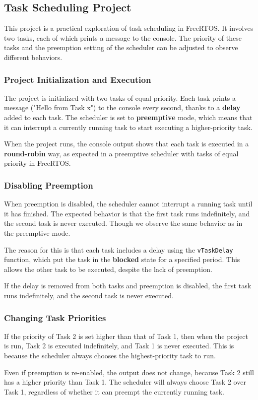 \subsection{Task Scheduling Project}

This project is a practical exploration of task scheduling in FreeRTOS. It involves two tasks, each of which prints a message to the console. The priority of these tasks and the preemption setting of the scheduler can be adjusted to observe different behaviors.

\subsubsection{Project Initialization and Execution}

The project is initialized with two tasks of equal priority. Each task prints a message ("Hello from Task x") to the console every second, thanks to a \textbf{delay} added to each task. The scheduler is set to \textbf{preemptive} mode, which means that it can interrupt a currently running task to start executing a higher-priority task.

When the project runs, the console output shows that each task is executed in a \textbf{round-robin} way, as expected in a preemptive scheduler with tasks of equal priority in FreeRTOS.

\subsubsection{Disabling Preemption}

When preemption is disabled, the scheduler cannot interrupt a running task until it has finished. The expected behavior is that the first task runs indefinitely, and the second task is never executed. Though we observe the same behavior as in the preemptive mode.

The reason for this is that each task includes a delay using the \texttt{vTaskDelay} function, which put the task in the \textbf{blocked} state for a specified period. This allows the other task to be executed, despite the lack of preemption.

If the delay is removed from both tasks and preemption is disabled, the first task runs indefinitely, and the second task is never executed.

\subsubsection{Changing Task Priorities}

If the priority of Task 2 is set higher than that of Task 1, then when the project is run, Task 2 is executed indefinitely, and Task 1 is never executed. This is because the scheduler always chooses the highest-priority task to run.

Even if preemption is re-enabled, the output does not change, because Task 2 still has a higher priority than Task 1. The scheduler will always choose Task 2 over Task 1, regardless of whether it can preempt the currently running task.